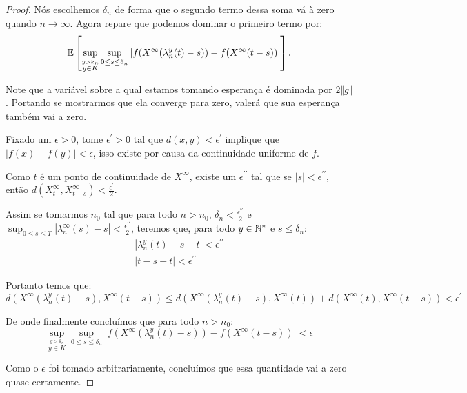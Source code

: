 \begin{proof}
  Nós escolhemos $\delta_n$ de forma que o segundo termo dessa soma vá
  à zero quando $n \to \infty$. Agora repare que podemos dominar o
  primeiro termo por:
  \begin{displaymath}
     {\mathbb{E}} \left[ \sup_{\stackrel{y > k_n}{y\in K}}
      \sup_{0 \leq s \leq \delta_n} \left\lvert
        f(X^\infty(\lambda_n^y(t)-s)) -
        f(X^\infty(t-s))
    \right\rvert \right].
  \end{displaymath}

  Note que a variável sobre a qual estamos tomando esperança é
  dominada por $2\Vert g \Vert$. Portando se mostrarmos que ela
  converge \qc para zero, valerá que sua esperança também vai a zero.

  Fixado um $\epsilon > 0$, tome $\epsilon^\prime > 0$ tal que $d(x, y) <
  \epsilon^\prime$ implique que $|f(x) - f(y)| < \epsilon$, isso
  existe por causa da continuidade uniforme de $f$.
 
  Como $t$ é \qc um ponto de continuidade de $X^\infty$, existe um
  $\epsilon^{\prime\prime}$ tal que se $|s| <
  \epsilon^{\prime\prime}$, então $d(X^\infty_t, X^\infty_{t+s}) <
  \frac{\epsilon^{\prime}}{2}$.

  Assim se tomarmos $n_0$ tal que para todo $n > n_0$, $\delta_{n} <
  \frac{\epsilon^{\prime\prime}}{2}$ e $\sup_{0 \leq s \leq T}
  |\lambda_n^\infty(s) - s| < \frac{\epsilon^{\prime\prime}}{2}$, teremos
  que, para todo $y\in{\mathbb{\bar{N}^*}}$ e $s \leq \delta_n$:
  \begin{gather*}
    |\lambda_n^y(t) - s - t| < \epsilon^{\prime\prime}\\
    |t - s - t | < \epsilon^{\prime\prime}
  \end{gather*}
  
  Portanto temos que:
  \begin{displaymath}
    d(X^\infty(\lambda_n^y(t)-s), X^\infty(t-s)) \leq
     d(X^\infty(\lambda_n^y(t)-s), X^\infty(t))+
     d(X^\infty(t), X^\infty(t-s))
     < \epsilon^{\prime}
  \end{displaymath}

  De onde finalmente concluímos que para todo $n > n_0$:
  \begin{displaymath} 
    \sup_{\stackrel{y > k_n}{y \in K}}
    \sup_{0 \leq s \leq \delta_n} \left\lvert
      f(X^\infty(\lambda_n^y(t)-s)) -
      f(X^\infty(t-s))
    \right\rvert < \epsilon
  \end{displaymath}

  Como o $\epsilon$ foi tomado arbitrariamente, concluímos que essa
  quantidade vai a zero quase certamente.
\end{proof}

